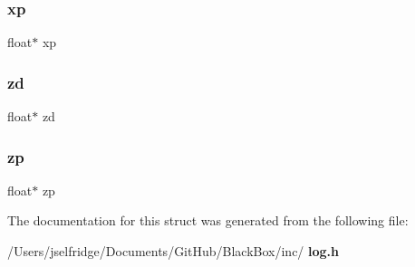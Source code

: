 \mbox{\label{structlog__sf__struct_a262628af13c44d25a73a0b388eff08c1}} 
\subsubsection{xp}
{\footnotesize\ttfamily float$\ast$ xp}

\mbox{\label{structlog__sf__struct_a1f3d92465e3a594ec1e789b882528f85}} 
\subsubsection{zd}
{\footnotesize\ttfamily float$\ast$ zd}

\mbox{\label{structlog__sf__struct_afbc47eb1750583270501944c156576b7}} 
\subsubsection{zp}
{\footnotesize\ttfamily float$\ast$ zp}



The documentation for this struct was generated from the following file\+:\begin{DoxyCompactItemize}
\item 
/\+Users/jselfridge/\+Documents/\+Git\+Hub/\+Black\+Box/inc/\textbf{ log.\+h}\end{DoxyCompactItemize}
